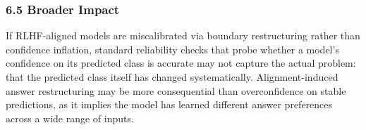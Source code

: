 \subsubsection{6.5 Broader Impact}

If RLHF-aligned models are miscalibrated via boundary restructuring rather than confidence inflation, standard reliability checks that probe whether a model's confidence on its predicted class is accurate may not capture the actual problem: that the predicted class itself has changed systematically. Alignment-induced answer restructuring may be more consequential than overconfidence on stable predictions, as it implies the model has learned different answer preferences across a wide range of inputs.
